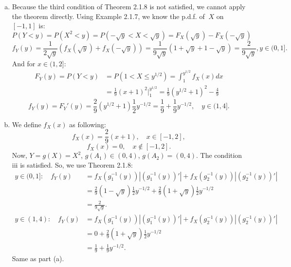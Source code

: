 \documentclass[14pt]{elegantbook}
\begin{document}
    \begin{solution}
        \begin{enumerate}[(a)]
            \item Because the third condition of Theorem 2.1.8 is not satisfied, we cannot apply the theorem directly. 
            Using Example 2.1.7, we know the p.d.f. of $\ X$ on $[-1,1]$ is: 
            \[P(Y<y)=P(X^2<y)=P(-\sqrt{y}<X<\sqrt{y})=F_X(\sqrt{y})-F_X(-\sqrt{y})\]
            \[f_Y(y)=\frac{1}{2\sqrt{y}}(f_X(\sqrt{y})+f_X(-\sqrt{y}))=\frac{1}{9\sqrt{y}}(1+\sqrt{y}+1-\sqrt{y})=\frac{2}{9\sqrt{y}},y\in (0, 1]. \]
            And for $x\in (1,2]$: 
            \begin{align*}
                F_Y(y)=P(Y<y)&=P(1<X\leq y^{1/2})=\int_{1}^{y^{1/2}}f_X(x)dx\\
                &=\frac{1}{9}(x+1)^2|_1^{y^{1/2}}=\frac{1}{9}(y^{1/2}+1)^2-\frac{4}{9}
            \end{align*}
            \[f_Y(y)=F_Y'(y)=\frac{2}{9}(y^{1/2}+1)\frac{1}{2}y^{-1/2}=\frac{1}{9}+\frac{1}{9}y^{-1/2}, \quad y\in(1,4]. \]
            \item 
            We define $f_X(x)$ as following: 
            \[
                f_X(x)=\frac{2}{9}(x+1), \quad x\in [-1, 2], 
            \]
            \[
                f_X(x)=0, \quad x\notin [-1, 2].
            \]
            Now, $Y=g(X)=X^2$, $g(A_1)\in(0,4)$, $g(A_2)=(0,4)$. The condition iii is satisfied. So, we use Theorem 2.1.8: 
            \begin{align*}
                y\in(0,1]: \quad f_Y(y)&=f_X(g_1^{-1}(y))\left|\left(g_1^{-1}(y)\right)'\right|+f_X(g_2^{-1}(y))\left|\left(g_2^{-1}(y)\right)'\right|\\
                &=\frac{2}{9}(1-\sqrt{y})\frac{1}{2}y^{-1/2}+\frac{2}{9}(1+\sqrt{y})\frac{1}{2}y^{-1/2}\\
                &=\frac{2}{9\sqrt{y}}.\\
                y\in(1,4): \quad f_Y(y)&=f_X(g_1^{-1}(y))\left|\left(g_1^{-1}(y)\right)'\right|+f_X(g_2^{-1}(y))\left|\left(g_2^{-1}(y)\right)'\right|\\
                &=0+\frac{2}{9}(1+\sqrt{y})\frac{1}{2}y^{-1/2}\\
                &=\frac{1}{9}+\frac{1}{9}y^{-1/2}.
            \end{align*}
            Same as part (a). 
        \end{enumerate}
    \end{solution}
\end{document}
